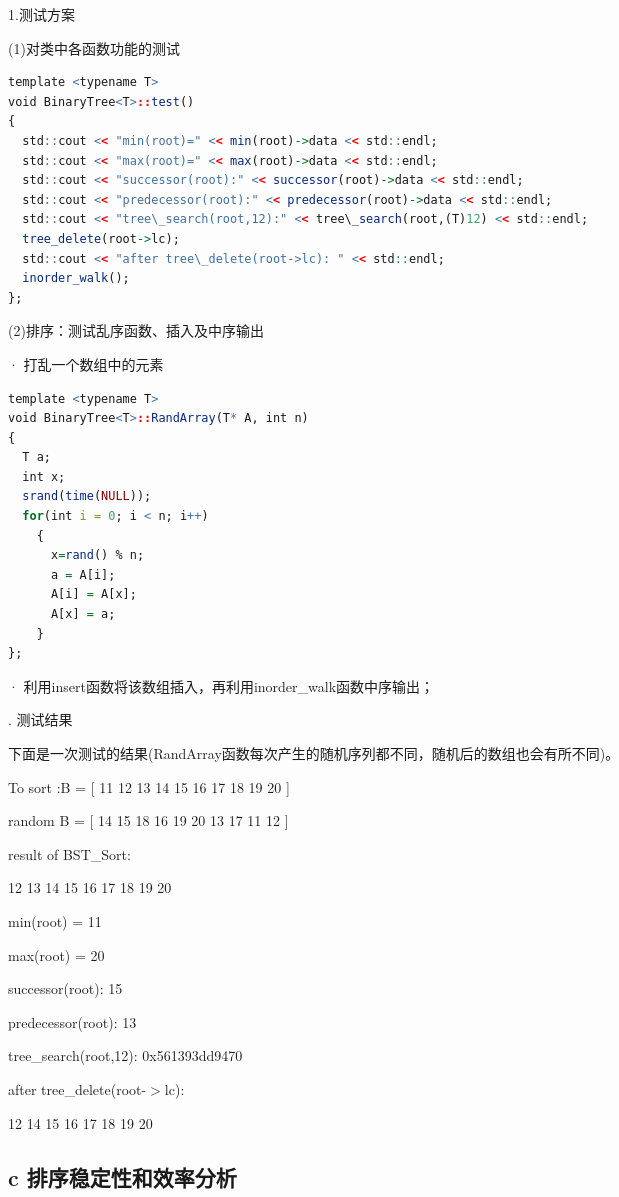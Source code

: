 \documentclass[twoside,a4paper]{article}
\begin{document}
\begin{CJK*}{UTF8}{gkai}
\noindent 1.测试方案

\noindent (1)对类中各函数功能的测试
\begin{lstlisting}[language=R]
template <typename T>
void BinaryTree<T>::test()
{
  std::cout << "min(root)=" << min(root)->data << std::endl;
  std::cout << "max(root)=" << max(root)->data << std::endl;
  std::cout << "successor(root):" << successor(root)->data << std::endl;
  std::cout << "predecessor(root):" << predecessor(root)->data << std::endl;
  std::cout << "tree\_search(root,12):" << tree\_search(root,(T)12) << std::endl;
  tree_delete(root->lc);
  std::cout << "after tree\_delete(root->lc): " << std::endl;
  inorder_walk();
};
\end{lstlisting}

\noindent (2)排序：测试乱序函数、插入及中序输出

\noindent · 打乱一个数组中的元素
\begin{lstlisting}[language=R]
template <typename T>
void BinaryTree<T>::RandArray(T* A, int n)
{
  T a;
  int x;
  srand(time(NULL));
  for(int i = 0; i < n; i++)
    {
      x=rand() % n;
      a = A[i];
      A[i] = A[x];
      A[x] = a;
    }
};
\end{lstlisting}

\noindent · 利用insert函数将该数组插入，再利用inorder\_walk函数中序输出；


. 测试结果

\noindent 下面是一次测试的结果(RandArray函数每次产生的随机序列都不同，随机后的数组也会有所不同)。

\noindent To sort :B = [ 11 12 13 14 15 16 17 18 19 20 ]

\noindent random B = [ 14 15 18 16 19 20 13 17 11 12 ]

\noindent result of BST\_Sort:

	12	13	14	15	16	17	18	19	20

\noindent min(root) = 11

\noindent max(root) = 20

\noindent successor(root): 15

\noindent predecessor(root): 13

\noindent tree\_search(root,12): 0x561393dd9470

\noindent after tree\_delete(root-$>$lc):

	12	14	15	16	17	18	19	20



  
\subsection*{c  排序稳定性和效率分析}


\end{CJK*}
\end{document}
